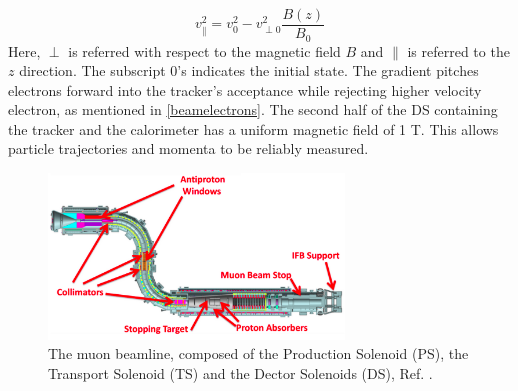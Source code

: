 \begin{equation}
    v^2_{\parallel}=v^2_0-v^2_{\perp 0}\frac{B(z)}{B_0}
\end{equation}
Here, $\perp$ is referred with respect to the magnetic field $B$ and $\parallel$ is 
referred to the $z$ direction. The subscript 0's indicates the initial state. 
The gradient pitches electrons forward into the tracker's acceptance while 
rejecting higher velocity electron, as mentioned in \ref{beamelectrons}. 
The second half of the DS containing the tracker and the calorimeter has a 
uniform magnetic field of 1 T. This allows particle trajectories and momenta 
to be reliably measured.
\begin{figure}[!h]
\centering
\includegraphics[width =0.7\textwidth]{figures/png/Screenshot_20240303_152845.png}
\caption[The muon beamline.]{The muon beamline, composed of the Production Solenoid (PS), 
the Transport Solenoid (TS) and the Dector Solenoids (DS), Ref. \cite{ginther}. 
}
\label{fig:muonbeamline}
\end{figure}


